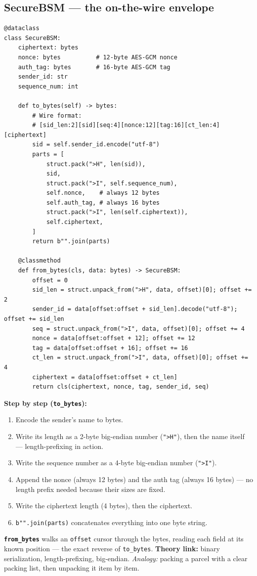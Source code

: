 \documentclass[11pt,a4paper]{article}
\begin{document}
\subsection{SecureBSM --- the on-the-wire envelope}
\begin{lstlisting}[style=py,caption={v2v\_protocol.py --- SecureBSM and its binary wire format.}]
@dataclass
class SecureBSM:
    ciphertext: bytes
    nonce: bytes          # 12-byte AES-GCM nonce
    auth_tag: bytes       # 16-byte AES-GCM tag
    sender_id: str
    sequence_num: int

    def to_bytes(self) -> bytes:
        # Wire format:
        # [sid_len:2][sid][seq:4][nonce:12][tag:16][ct_len:4][ciphertext]
        sid = self.sender_id.encode("utf-8")
        parts = [
            struct.pack(">H", len(sid)),
            sid,
            struct.pack(">I", self.sequence_num),
            self.nonce,    # always 12 bytes
            self.auth_tag, # always 16 bytes
            struct.pack(">I", len(self.ciphertext)),
            self.ciphertext,
        ]
        return b"".join(parts)

    @classmethod
    def from_bytes(cls, data: bytes) -> SecureBSM:
        offset = 0
        sid_len = struct.unpack_from(">H", data, offset)[0]; offset += 2
        sender_id = data[offset:offset + sid_len].decode("utf-8"); offset += sid_len
        seq = struct.unpack_from(">I", data, offset)[0]; offset += 4
        nonce = data[offset:offset + 12]; offset += 12
        tag = data[offset:offset + 16]; offset += 16
        ct_len = struct.unpack_from(">I", data, offset)[0]; offset += 4
        ciphertext = data[offset:offset + ct_len]
        return cls(ciphertext, nonce, tag, sender_id, seq)
\end{lstlisting}
\textbf{Step by step (\texttt{to\_bytes}):}
\begin{enumerate}
  \item Encode the sender's name to bytes.
  \item Write its length as a 2-byte big-endian number (\texttt{">H"}), then the
        name itself --- length-prefixing in action.
  \item Write the sequence number as a 4-byte big-endian number (\texttt{">I"}).
  \item Append the nonce (always 12 bytes) and the auth tag (always 16 bytes) ---
        no length prefix needed because their sizes are fixed.
  \item Write the ciphertext length (4 bytes), then the ciphertext.
  \item \texttt{b"".join(parts)} concatenates everything into one byte string.
\end{enumerate}
\textbf{\texttt{from\_bytes}} walks an \texttt{offset} cursor through the bytes,
reading each field at its known position --- the exact reverse of
\texttt{to\_bytes}. \textbf{Theory link:} binary serialization, length-prefixing,
big-endian. \emph{Analogy:} packing a parcel with a clear packing list, then
unpacking it item by item.
\end{document}
